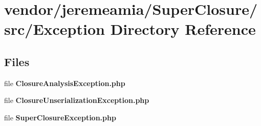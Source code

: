 \section{vendor/jeremeamia/\+Super\+Closure/src/\+Exception Directory Reference}
\label{dir_baa89f11df37a9076e222096df7f8aed}
\subsection*{Files}
\begin{DoxyCompactItemize}
\item 
file {\bf Closure\+Analysis\+Exception.\+php}
\item 
file {\bf Closure\+Unserialization\+Exception.\+php}
\item 
file {\bf Super\+Closure\+Exception.\+php}
\end{DoxyCompactItemize}
